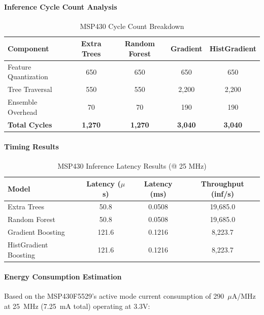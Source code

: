 \paragraph{Inference Cycle Count Analysis}

\begin{table}[htbp]
\centering
\caption{MSP430 Cycle Count Breakdown}
\label{tab:msp430_cycles}
\begin{tabular}{lcccc}
\hline
\textbf{Component} & \textbf{Extra Trees} & \textbf{Random Forest} & \textbf{Gradient} & \textbf{HistGradient} \\
\hline
Feature Quantization & 650 & 650 & 650 & 650 \\
Tree Traversal & 550 & 550 & 2,200 & 2,200 \\
Ensemble Overhead & 70 & 70 & 190 & 190 \\
\textbf{Total Cycles} & \textbf{1,270} & \textbf{1,270} & \textbf{3,040} & \textbf{3,040} \\
\hline
\end{tabular}
\end{table}

\paragraph{Timing Results}

\begin{table}[htbp]
\centering
\caption{MSP430 Inference Latency Results (@ 25 MHz)}
\label{tab:msp430_latency}
\begin{tabular}{lccc}
\hline
\textbf{Model} & \textbf{Latency ($\mu$s)} & \textbf{Latency (ms)} & \textbf{Throughput (inf/s)} \\
\hline
Extra Trees & 50.8 & 0.0508 & 19,685.0 \\
Random Forest & 50.8 & 0.0508 & 19,685.0 \\
Gradient Boosting & 121.6 & 0.1216 & 8,223.7 \\
HistGradient Boosting & 121.6 & 0.1216 & 8,223.7 \\
\hline
\end{tabular}
\end{table}

\paragraph{Energy Consumption Estimation}

Based on the MSP430F5529's active mode current consumption of 290~$\mu$A/MHz at 25~MHz (7.25~mA total) operating at 3.3V:


